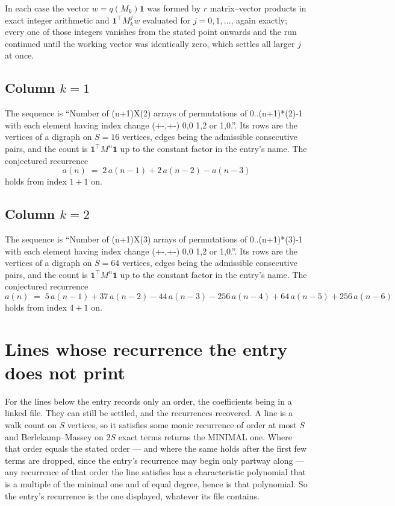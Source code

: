 \documentclass[11pt,a4paper]{article}
\theoremstyle{plain}
\theoremstyle{definition}
\begin{document}
In each case the vector $w=q(M_k)\mathbf{1}$ was formed by $r$ matrix--vector products in
exact integer arithmetic and $\mathbf{1}^{\!\top}M_k^{j}w$ evaluated for $j=0,1,\dots$,
again exactly; every one of those integers vanishes from the stated point onwards and the run
continued until the working vector was identically zero, which settles all larger $j$ at once.

\subsection*{Column $k$$=1$}
The sequence is ``Number of (n+1)X(2) arrays of permutations of 0..(n+1)*(2)-1 with each element having index change (+-,+-) 0,0 1,2 or 1,0.''. Its rows are the vertices of a digraph on
$S=16$ vertices, edges being the admissible consecutive pairs, and the count is
$\mathbf{1}^{\!\top}M^{n}\mathbf{1}$ up to the constant factor in the entry's name.
The conjectured recurrence
\[
a(n)\;=\;2\,a(n-1) + 2\,a(n-2) - a(n-3)
\]
holds from index $1+1$ on.

\subsection*{Column $k$$=2$}
The sequence is ``Number of (n+1)X(3) arrays of permutations of 0..(n+1)*(3)-1 with each element having index change (+-,+-) 0,0 1,2 or 1,0.''. Its rows are the vertices of a digraph on
$S=64$ vertices, edges being the admissible consecutive pairs, and the count is
$\mathbf{1}^{\!\top}M^{n}\mathbf{1}$ up to the constant factor in the entry's name.
The conjectured recurrence
\[
a(n)\;=\;5\,a(n-1) + 37\,a(n-2) - 44\,a(n-3) - 256\,a(n-4) + 64\,a(n-5) + 256\,a(n-6)
\]
holds from index $4+1$ on.


\section{Lines whose recurrence the entry does not print}

For the lines below the entry records only an order, the coefficients being in a linked file.
They can still be settled, and the recurrences recovered. A line is a walk count on $S$
vertices, so it satisfies some monic recurrence of order at most $S$ and Berlekamp--Massey on
$2S$ exact terms returns the MINIMAL one. Where that order equals the stated order --- and
where the same holds after the first few terms are dropped, since the entry's recurrence may
begin only partway along --- any recurrence of that order the line satisfies has a
characteristic polynomial that is a multiple of the minimal one and of equal degree, hence is
that polynomial. So the entry's recurrence is the one displayed, whatever its file contains.
\end{document}
